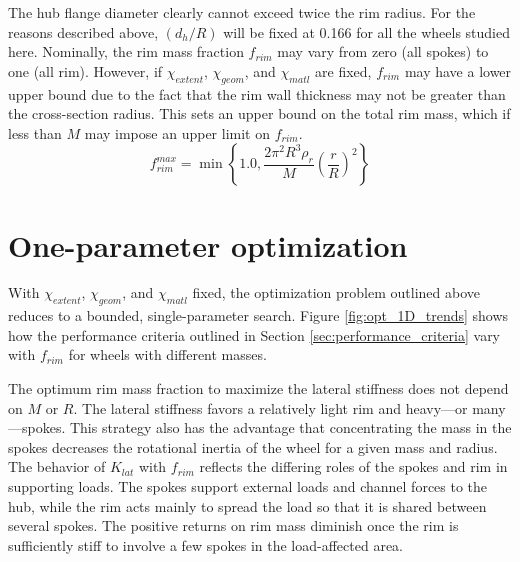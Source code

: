 \documentclass[\rootdir/thesis.tex]{subfiles}
\begin{document}
The hub flange diameter clearly cannot exceed twice the rim radius. For the reasons described above, $(d_h/R)$ will be fixed at 0.166 for all the wheels studied here. Nominally, the rim mass fraction $f_{rim}$ may vary from zero (all spokes) to one (all rim). However, if $\chi_{extent}$, $\chi_{geom}$, and $\chi_{matl}$ are fixed, $f_{rim}$ may have a lower upper bound due to the fact that the rim wall thickness may not be greater than the cross-section radius. This sets an upper bound on the total rim mass, which if less than $M$ may impose an upper limit on $f_{rim}$.
\begin{equation}
\label{eqn:frim_max}
f_{rim}^{max} = \min\left\lbrace 1.0, \frac{2\pi^2 R^3\rho_r}{M}\left(\frac{r}{R}\right)^2 \right\rbrace
\end{equation}

\section{One-parameter optimization}



With $\chi_{extent}$, $\chi_{geom}$, and $\chi_{matl}$ fixed, the optimization problem outlined above reduces to a bounded, single-parameter search. Figure \ref{fig:opt_1D_trends} shows how the performance criteria outlined in Section \ref{sec:performance_criteria} vary with $f_{rim}$ for wheels with different masses. 

The optimum rim mass fraction to maximize the lateral stiffness does not depend on $M$ or $R$. The lateral stiffness favors a relatively light rim and heavy---or many---spokes. This strategy also has the advantage that concentrating the mass in the spokes decreases the rotational inertia of the wheel for a given mass and radius. The behavior of $K_{lat}$ with $f_{rim}$ reflects the differing roles of the spokes and rim in supporting loads. The spokes support external loads and channel forces to the hub, while the rim acts mainly to spread the load so that it is shared between several spokes. The positive returns on rim mass diminish once the rim is sufficiently stiff to involve a few spokes in the load-affected area.
\end{document}
